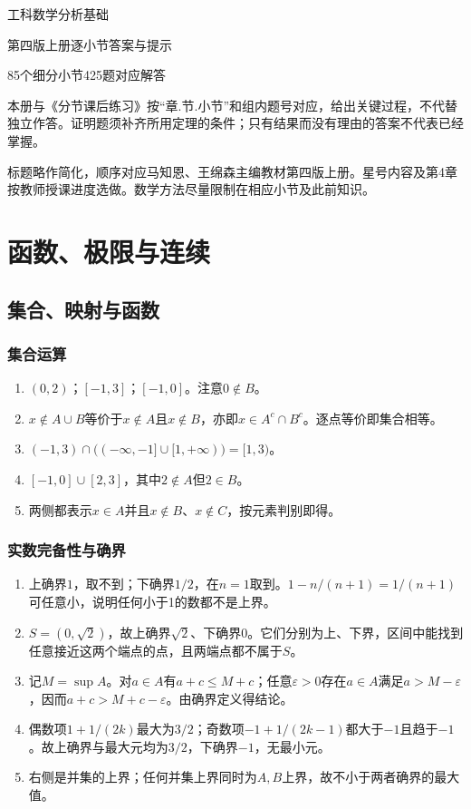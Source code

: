 \documentclass[11pt,a4paper,fontset=fandol]{ctexrep}
\begin{document}
\begin{titlepage}\centering
{\Huge 工科数学分析基础\par}\vspace{8mm}
{\LARGE 第四版上册\quad 逐小节答案与提示\par}\vspace{10mm}
85个细分小节\quad 425题对应解答\par
\vfill\raggedright
本册与《分节课后练习》按“章.节.小节”和组内题号对应，给出关键过程，不代替独立作答。证明题须补齐所用定理的条件；只有结果而没有理由的答案不代表已经掌握。

标题略作简化，顺序对应马知恩、王绵森主编教材第四版上册。星号内容及第4章按教师授课进度选做。数学方法尽量限制在相应小节及此前知识。
\end{titlepage}
\tableofcontents
\chapter{函数、极限与连续}
\section{集合、映射与函数}
\subsection{集合运算}
\begin{enumerate}
\item $(0,2)$；$[-1,3]$；$[-1,0]$。注意$0\notin B$。
\item $x\notin A\cup B$等价于$x\notin A$且$x\notin B$，亦即$x\in A^c\cap B^c$。逐点等价即集合相等。
\item $(-1,3)\cap\bigl((-\infty,-1]\cup[1,+\infty)\bigr)=[1,3)$。
\item $[-1,0]\cup[2,3]$，其中$2\notin A$但$2\in B$。
\item 两侧都表示$x\in A$并且$x\notin B$、$x\notin C$，按元素判别即得。
\end{enumerate}
\subsection{实数完备性与确界}
\begin{enumerate}
\item 上确界$1$，取不到；下确界$1/2$，在$n=1$取到。$1-n/(n+1)=1/(n+1)$可任意小，说明任何小于1的数都不是上界。
\item $S=(0,\sqrt2)$，故上确界$\sqrt2$、下确界$0$。它们分别为上、下界，区间中能找到任意接近这两个端点的点，且两端点都不属于$S$。
\item 记$M=\sup A$。对$a\in A$有$a+c\le M+c$；任意$\varepsilon>0$存在$a\in A$满足$a>M-\varepsilon$，因而$a+c>M+c-\varepsilon$。由确界定义得结论。
\item 偶数项$1+1/(2k)$最大为$3/2$；奇数项$-1+1/(2k-1)$都大于$-1$且趋于$-1$。故上确界与最大元均为$3/2$，下确界$-1$，无最小元。
\item 右侧是并集的上界；任何并集上界同时为$A,B$上界，故不小于两者确界的最大值。
\end{enumerate}
\end{document}

